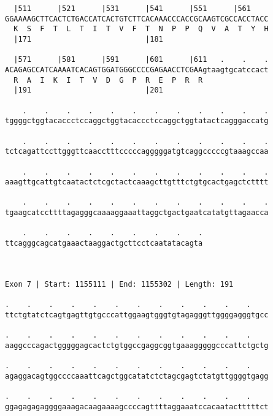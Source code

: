\documentclass{article}
\begin{document}
\begin{Verbatim}
  |511      |521      |531      |541      |551      |561    
GGAAAAGCTTCACTCTGACCATCACTGTCTTCACAAACCCACCGCAAGTCGCCACCTACC
  K  S  F  T  L  T  I  T  V  F  T  N  P  P  Q  V  A  T  Y  H
  |171                          |181                        
  
  |571      |581      |591      |601      |611   .    .    .
ACAGAGCCATCAAAATCACAGTGGATGGGCCCCGAGAACCTCGAAgtaagtgcatccact
  R  A  I  K  I  T  V  D  G  P  R  E  P  R  R               
  |191                          |201                        
  
    .    .    .    .    .    .    .    .    .    .    .    .
tggggctggtacaccctccaggctggtacaccctccaggctggtatactcagggaccatg
                                                            
    .    .    .    .    .    .    .    .    .    .    .    .
tctcagattccttgggttcaacctttcccccagggggatgtcaggcccccgtaaagccaa
                                                            
    .    .    .    .    .    .    .    .    .    .    .    .
aaagttgcattgtcaatactctcgctactcaaagcttgtttctgtgcactgagctctttt
                                                            
    .    .    .    .    .    .    .    .    .    .    .    .
tgaagcatccttttagagggcaaaaggaaattaggctgactgaatcatatgttagaacca
                                                            
    .    .    .    .    .    .    .    .    .
ttcagggcagcatgaaactaaggactgcttcctcaatatacagta
                                             
                                             
 
Exon 7 | Start: 1155111 | End: 1155302 | Length: 191
 
.    .    .    .    .    .    .    .    .    .    .    .    
ttctgtatctcagtgagttgtgcccattggaagtgggtgtagagggttggggagggtgcc
                                                            
.    .    .    .    .    .    .    .    .    .    .    .    
aaggcccagactgggggagcactctgtggccgaggcggtgaaagggggcccattctgctg
                                                            
.    .    .    .    .    .    .    .    .    .    .    .    
agaggacagtggccccaaattcagctggcatatctctagcgagtctatgttggggtgagg
                                                            
.    .    .    .    .    .    .    .    .    .    .    .    
ggagagagaggggaaagacaagaaaagccccagttttaggaaatccacaatactttttct
                                                            

\end{Verbatim}
\end{document}

